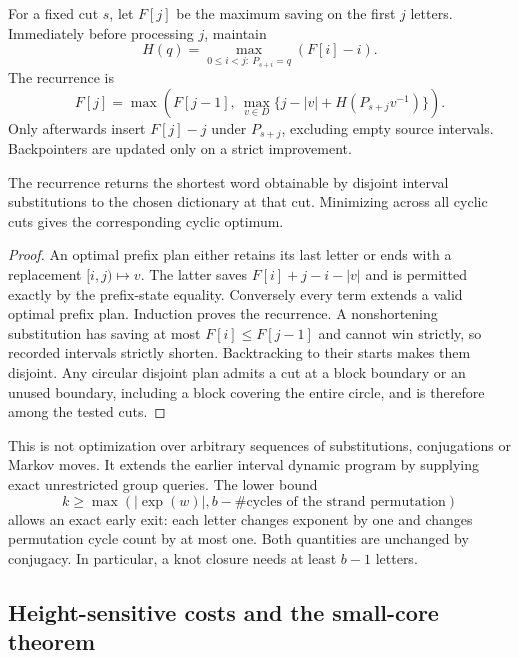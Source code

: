 For a fixed cut $s$, let $F[j]$ be the maximum saving on the first $j$
letters.  Immediately before processing $j$, maintain
\[
 H(q)=\max_{0\le i<j:\ P_{s+i}=q}(F[i]-i).
\]
The recurrence is
\[
 F[j]=\max\left(F[j-1],\ \max_{v\in D}
          \{j-|v|+H(P_{s+j}v^{-1})\}\right).
\]
Only afterwards insert $F[j]-j$ under $P_{s+j}$, excluding empty source
intervals.  Backpointers are updated only on a strict improvement.

\begin{proposition}
The recurrence returns the shortest word obtainable by disjoint interval
substitutions to the chosen dictionary at that cut.  Minimizing across
all cyclic cuts gives the corresponding cyclic optimum.
\end{proposition}
\begin{proof}
An optimal prefix plan either retains its last letter or ends with a
replacement $[i,j)\mapsto v$.  The latter saves $F[i]+j-i-|v|$ and is
permitted exactly by the prefix-state equality.  Conversely every term
extends a valid optimal prefix plan.  Induction proves the recurrence.
A nonshortening substitution has saving at most $F[i]\le F[j-1]$ and
cannot win strictly, so recorded intervals strictly shorten.  Backtracking
to their starts makes them disjoint.  Any circular disjoint plan admits
a cut at a block boundary or an unused boundary, including a block covering
the entire circle, and is therefore among the tested cuts.
\end{proof}

This is not optimization over arbitrary sequences of substitutions,
conjugations or Markov moves.  It extends the earlier interval dynamic
program by supplying exact unrestricted group queries.  The lower bound
\[
 k\ge\max\left(|\operatorname{exp}(w)|,
                      b-\#\text{cycles of the strand permutation}\right)
\]
allows an exact early exit: each letter changes exponent by one and changes
permutation cycle count by at most one.  Both quantities are unchanged by
conjugacy.  In particular, a knot closure needs at least $b-1$ letters.

\subsection{Height-sensitive costs and the small-core theorem}

